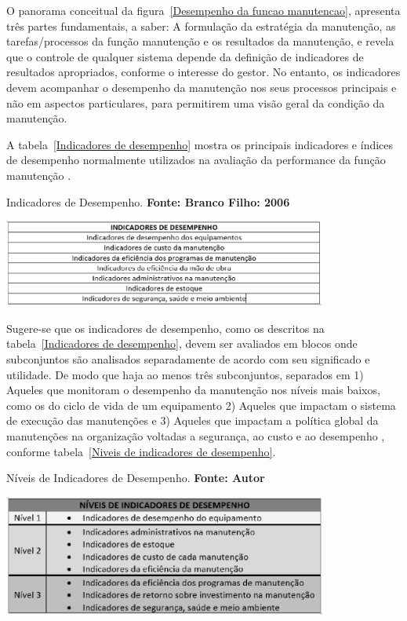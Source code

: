 O panorama conceitual da figura~\ref{Desempenho da funcao manutencao}, apresenta três partes fundamentais, a saber: A formulação da estratégia da manutenção, as tarefas/processos da função manutenção e os resultados da manutenção, e revela que o controle de qualquer sistema depende da definição de indicadores de resultados apropriados, conforme o interesse do gestor. No entanto, os indicadores devem acompanhar o desempenho da manutenção nos seus processos principais e não em aspectos particulares, para permitirem uma visão geral da condição da manutenção.

A tabela~\ref{Indicadores de desempenho} mostra os principais indicadores e índices de desempenho normalmente utilizados na avaliação da performance da função manutenção \cite{branco2006indicadores}.

\graphicspath{{figuras/}}	
\begin{table}[H]
\centering
\caption{Indicadores de Desempenho. \textbf{Fonte: Branco Filho: 2006}}
\includegraphics[width=0.8\textwidth]{IndicadoresBrancoFilho.eps}
\label{Indicadores de desempenho}
\end{table}

Sugere-se que os indicadores de desempenho, como os descritos na tabela~\ref{Indicadores de desempenho}, devem ser avaliados em blocos onde subconjuntos são analisados separadamente de acordo com seu significado e utilidade. De modo que haja ao menos três subconjuntos, separados em 1) Aqueles que monitoram o desempenho da manutenção nos níveis mais baixos, como os do ciclo de vida de um equipamento 2) Aqueles que impactam o sistema de execução das manutenções e 3) Aqueles que impactam a política global da manutenções na organização voltadas a segurança, ao custo e ao desempenho \cite{de2012indicadores}, conforme tabela~\ref{Niveis de indicadores de desempenho}.

\graphicspath{{figuras/}}
\begin{table}[H]
\centering
\caption{Níveis de Indicadores de Desempenho. \textbf{Fonte: Autor}}
\includegraphics[width=0.8\textwidth]{niveisdeindicadores.eps}
\label{Niveis de indicadores de desempenho}
\end{table}

